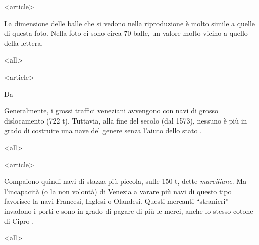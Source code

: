 
\mode
<article>

La dimensione  delle balle  che si vedono  nella riproduzione  è molto
simile a quelle di questa foto.  Nella foto ci sono circa 70 balle, un
valore molto vicino a quello della lettera.

\mode
<all>


\mode
<article>

Da \cite[p. 48]{cucari2004}

Generalmente, i grossi traffici veneziani avvengono con navi di grosso
dislocamento  (722 t).  Tuttavia,  alla fine  del  secolo (dal  1573),
nessuno è più in grado di  costruire una nave del genere senza l'aiuto
dello stato \cite[p. 325]{braudel1982}.

\mode
<all>


\mode
<article>

Compaiono quindi navi  di stazza più piccola, sulle  150 t, dette {\it
  marciliane}. Ma l'incapacità (o la  non volontà) di Venezia a varare
più  navi  di  questo  tipo  favorisce la  navi  Francesi,  Inglesi  o
Olandesi.  Questi  mercanti ``stranieri'' invadono  i porti e  sono in
grado  di pagare  di più  le merci,  anche lo  stesso cotone  di Cipro
\cite[p. 329]{braudel1982}.

\mode
<all>


